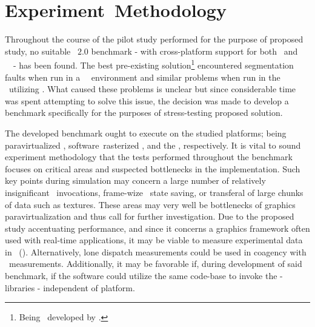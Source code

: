 \section{Experiment~Methodology}
\label{sec:researchmethodology_experimentmethodology}
Throughout the course of the pilot study performed for the purpose of proposed study, no suitable \termopengles ~$2.0$ benchmark - with cross-platform support for both \termandroid\ and \termxeleven ~\termlinux\ - has been found.
The best pre-existing solution\footnote{Being \termglmarktwo\ developed by \termlinaro .} encountered segmentation faults when run in a \termsimics\ \termlinux\ environment and similar problems when run in the \termandroidemu\ utilizing \termqemu.
What caused these problems is unclear but since considerable time was spent attempting to solve this issue, the decision was made to develop a benchmark specifically for the purposes of stress-testing proposed solution.

The developed benchmark ought to execute on the studied platforms; being paravirtualized \termsimics , software~rasterized \termsimics , and the \termrefsolu , respectively.
It is vital to sound experiment methodology that the tests performed throughout the benchmark focuses on critical areas and suspected bottlenecks in the implementation.
Such key points during simulation may concern a large number of relatively insignificant \termopengles\ invocations, frame-wize \termopengles\ state saving, or transferal of large chunks of data such as textures.
These areas may very well be bottlenecks of graphics paravirtualization and thus call for further investigation.
Due to the proposed study accentuating performance, and since it concerns a graphics framework often used with real-time applications, it may be viable to measure experimental data in \termframespersecond ~(\termfps ).
Alternatively, lone dispatch measurements could be used in coagency with \termframespersecond\ measurements.
Additionally, it may be favorable if, during development of said benchmark, if the software could utilize the same code-base to invoke the \termopengles -libraries - independent of platform.
